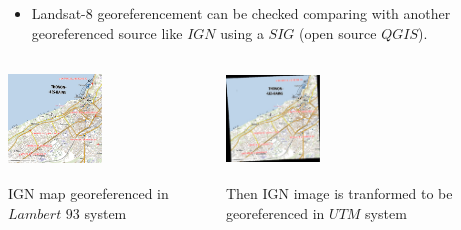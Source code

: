 \documentclass[c]{beamer}
\begin{document}
\begin{frame}
\begin{itemize}
 \item Landsat-8 georeferencement can be checked comparing with another georeferenced source like $IGN$ using a $SIG$ (open source $QGIS$).
\end{itemize}

\begin{columns}[t]
\begin{column}{0.30\textwidth}
\begin{overlayarea}{\linewidth}{3cm}
  \centering\vfill
  \includegraphics[height=2.5cm,width=2.5cm]{images/georeferencing/ign-points-Thonon.png}
\end{overlayarea}
\begin{overlayarea}{\linewidth}{2cm}
  \centering
  \scriptsize IGN map georeferenced in $Lambert$ $93$ system\par
\end{overlayarea}
\end{column}
\begin{column}{0.30\textwidth}
\begin{overlayarea}{\linewidth}{3cm}
  \centering\vfill
  \includegraphics[height=2.5cm,width=2.5cm]{images/georeferencing/qgis-resultat.png}
\end{overlayarea}
\begin{overlayarea}{\linewidth}{2cm}
  \centering
  \scriptsize Then IGN image is tranformed to be georeferenced in $UTM$ system\par
\end{overlayarea}

\end{column}
\end{columns}
\end{frame}
\end{document}
